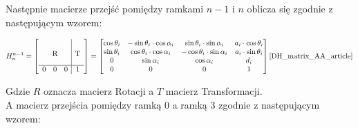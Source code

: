 \documentclass[a4paper,13pt]{article}
\begin{document}
Następnie macierze przejść pomiędzy ramkami $n-1$ i $n$ oblicza się zgodnie z następującym wzorem:

\begin{equation}
H^{n-1}_n = 
\left[\begin{array}{ccc|c}
&&&\\
&&&\\
\multicolumn{3}{c|}{\smash{\raisebox{0.75\normalbaselineskip}{R}}} & \smash{\raisebox{0.75\normalbaselineskip}{T}}\\
\hline
0 & 0 & 0 & 1\\
\end{array}\right] = 
\left[\begin{matrix}
\cos{\theta_i} & -\sin{\theta_i} \cdot \cos{\alpha_i} & \sin{\theta_i} \cdot \sin{\alpha_i} & a_i \cdot \cos{\theta_i}\\
\sin{\theta_i} & \cos{\theta_i} \cdot \cos{\alpha_i} & -\cos{\theta_i} \cdot \sin{\alpha_i} & a_i \cdot \sin{\theta_i}\\
0 & \sin{\alpha_i} & \cos{\alpha_i} & d_i\\
0 & 0 & 0 & 1\\
\end{matrix}\right]\cite{DH_matrix_AA_article}
\end{equation}

Gdzie $R$ oznacza macierz Rotacji a $T$ macierz Transformacji.\\

A macierz przejścia pomiędzy ramką 0 a ramką 3 zgodnie z następującym wzorem:
\end{document}
